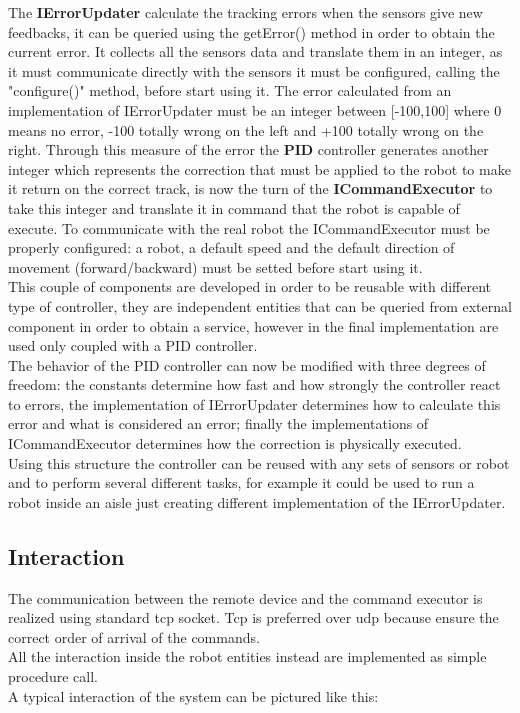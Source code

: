 \documentclass{llncs}
\begin{document}
\noindent The \textbf{IErrorUpdater} calculate the tracking errors when the sensors give new feedbacks, it can be queried using the getError() method in order to obtain the current error. It collects all the sensors data and translate them in an integer, as it must communicate directly with the sensors it must be configured, calling the "configure()" method, before start using it. The error calculated from an implementation of IErrorUpdater must be an integer between [-100,100] where 0 means no error, -100 totally wrong on the left and +100 totally wrong on the right. Through this measure of the error the \textbf{PID} controller generates another integer which represents the correction that must be applied to the robot to make it return on the correct track, is now the turn of the \textbf{ICommandExecutor} to take this integer and translate it in command that the robot is capable of execute. To communicate with the real robot the ICommandExecutor must be properly configured: a robot, a default speed and the default direction of movement (forward/backward) must be setted before start using it.\\ 
This couple of components are developed in order to be reusable with different type of controller, they are independent entities that can be queried from external component in order to obtain a service, however in the final implementation are used only coupled with a PID controller.\\
The behavior of the PID controller can now be modified with three degrees of freedom: the constants determine how fast and how strongly the controller react to errors, the implementation of IErrorUpdater determines how to calculate this error and what is considered an error; finally the implementations of ICommandExecutor determines how the correction is physically executed.\\
Using this structure the controller can be reused with any sets of sensors or robot and to perform several different tasks, for example it could be used to run a robot inside an aisle just creating different implementation of the IErrorUpdater.\\

\subsection{Interaction}
The communication between the remote device and the command executor is realized using standard tcp socket. Tcp is preferred over udp because ensure the correct order of arrival of the commands.\\
All the interaction inside the robot entities instead are implemented as simple procedure call. \\
A typical interaction of the system can be pictured like this:
\begin{center}
\end{center}
\end{document}
